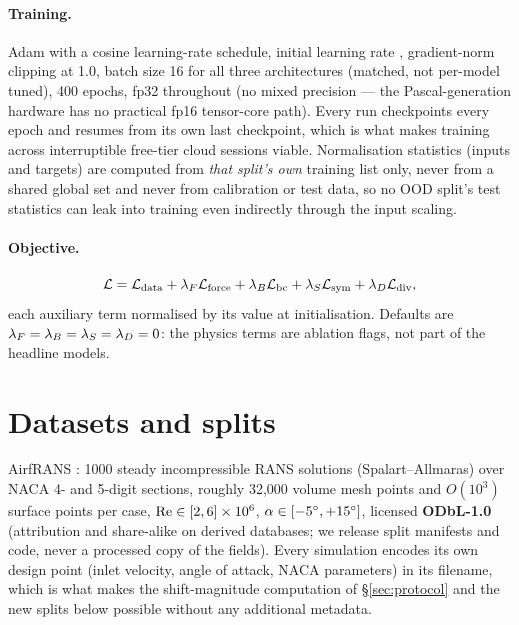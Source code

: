 \documentclass[11pt,a4paper]{article}
\begin{document}
\paragraph{Training.} Adam with a cosine learning-rate schedule, initial
learning rate , gradient-norm clipping at 1.0, batch size 16
for all three architectures (matched, not per-model tuned), 400 epochs, fp32
throughout (no mixed precision --- the Pascal-generation hardware has no
practical fp16 tensor-core path). Every run checkpoints every epoch and resumes
from its own last checkpoint, which is what makes training across
interruptible free-tier cloud sessions viable. Normalisation statistics
(inputs and targets) are computed from \emph{that split's own} training list
only, never from a shared global set and never from calibration or test data,
so no OOD split's test statistics can leak into training even indirectly
through the input scaling.

\paragraph{Objective.}
\begin{equation}
  \mathcal{L} = \mathcal{L}_{\text{data}} + \lambda_F \mathcal{L}_{\text{force}} + \lambda_B \mathcal{L}_{\text{bc}}
        + \lambda_S \mathcal{L}_{\text{sym}} + \lambda_D \mathcal{L}_{\text{div}},
\end{equation}
each auxiliary term normalised by its value at initialisation. Defaults are
$\lambda_F = \lambda_B = \lambda_S = \lambda_D = 0$: the physics terms are ablation flags, not
part of the headline models.

\section{Datasets and splits}
\label{sec:data}

AirfRANS \citep{bonnet2022airfrans}: 1000 steady incompressible RANS solutions
(Spalart--Allmaras) over NACA 4- and 5-digit sections, roughly 32{,}000 volume
mesh points and $O(10^3)$ surface points per case, $\mathrm{Re} \in [2,6]\times 10^6$,
$\alpha \in [-5^{\circ}, +15^{\circ}]$, licensed \textbf{ODbL-1.0} (attribution and
share-alike on derived databases; we release split manifests and code, never a
processed copy of the fields). Every simulation encodes its own design point
(inlet velocity, angle of attack, NACA parameters) in its filename, which is
what makes the shift-magnitude computation of \S\ref{sec:protocol} and the new
splits below possible without any additional metadata.
\end{document}
